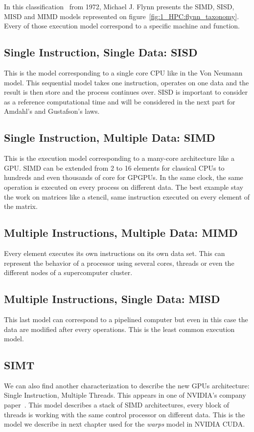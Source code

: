 In this classification~\cite{flynn1972some} from 1972, Michael J. Flynn presents the SIMD, SISD, MISD and MIMD models represented on figure~\ref{fig:1_HPC:flynn_taxonomy}.
Every of those execution model correspond to a specific machine and function.

\subsection{Single Instruction, Single Data: SISD}
This is the model corresponding to a single core CPU like in the Von Neumann model. 
This sequential model takes one instruction, operates on one data and the result is then store and the process continues over. 
SISD is important to consider as a reference computational time and will be considered in the next part for Amdahl's and Gustafson's laws.

\subsection{Single Instruction, Multiple Data: SIMD}
This is the execution model corresponding to a many-core architecture like a GPU. 
SIMD can be extended from 2 to 16 elements for classical CPUs to hundreds and even thousands of core for GPGPUs. 
In the same clock, the same operation is executed on every process on different data. 
The best example stay the work on matrices like a stencil, same instruction executed on every element of the matrix. 

\subsection{Multiple Instructions, Multiple Data: MIMD}
Every element executes its own instructions on its own data set. 
This can represent the behavior of a processor using several cores, threads or even the different nodes of a supercomputer cluster. 

\subsection{Multiple Instructions, Single Data: MISD}
This last model can correspond to a pipelined computer but even in this case the data are modified after every operations.
This is the least common execution model.

\subsection{SIMT}
We can also find another characterization to describe the new GPUs architecture: Single Instruction, Multiple Threads. 
This appears in one of NVIDIA's company paper~\cite{lindholm2008nvidia}. 
This model describes a stack of SIMD architectures, every block of threads is working with the same control processor on different data. 
This is the model we describe in next chapter used for the \textit{warps} model in NVIDIA CUDA.

